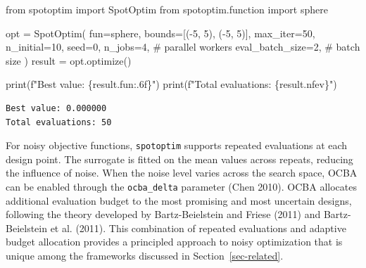 \documentclass[
  twocolumn]{article}
\newenvironment{Shaded}{\begin{snugshade}}{\end{snugshade}}
\newcommand{\BuiltInTok}[1]{\textcolor[rgb]{0.00,0.23,0.31}{#1}}
\newcommand{\CommentTok}[1]{\textcolor[rgb]{0.37,0.37,0.37}{#1}}
\newcommand{\DecValTok}[1]{\textcolor[rgb]{0.68,0.00,0.00}{#1}}
\newcommand{\ImportTok}[1]{\textcolor[rgb]{0.00,0.46,0.62}{#1}}
\newcommand{\NormalTok}[1]{\textcolor[rgb]{0.00,0.23,0.31}{#1}}
\newcommand{\OperatorTok}[1]{\textcolor[rgb]{0.37,0.37,0.37}{#1}}
\newcommand{\SpecialCharTok}[1]{\textcolor[rgb]{0.37,0.37,0.37}{#1}}
\newcommand{\SpecialStringTok}[1]{\textcolor[rgb]{0.13,0.47,0.30}{#1}}
\begin{document}
\begin{Shaded}
\begin{Highlighting}[]
\ImportTok{from}\NormalTok{ spotoptim }\ImportTok{import}\NormalTok{ SpotOptim}
\ImportTok{from}\NormalTok{ spotoptim.function }\ImportTok{import}\NormalTok{ sphere}

\NormalTok{opt }\OperatorTok{=}\NormalTok{ SpotOptim(}
\NormalTok{    fun}\OperatorTok{=}\NormalTok{sphere,}
\NormalTok{    bounds}\OperatorTok{=}\NormalTok{[(}\OperatorTok{{-}}\DecValTok{5}\NormalTok{, }\DecValTok{5}\NormalTok{), (}\OperatorTok{{-}}\DecValTok{5}\NormalTok{, }\DecValTok{5}\NormalTok{)],}
\NormalTok{    max\_iter}\OperatorTok{=}\DecValTok{50}\NormalTok{,}
\NormalTok{    n\_initial}\OperatorTok{=}\DecValTok{10}\NormalTok{,}
\NormalTok{    seed}\OperatorTok{=}\DecValTok{0}\NormalTok{,}
\NormalTok{    n\_jobs}\OperatorTok{=}\DecValTok{4}\NormalTok{,           }\CommentTok{\# parallel workers}
\NormalTok{    eval\_batch\_size}\OperatorTok{=}\DecValTok{2}\NormalTok{,  }\CommentTok{\# batch size}
\NormalTok{)}
\NormalTok{result }\OperatorTok{=}\NormalTok{ opt.optimize()}

\BuiltInTok{print}\NormalTok{(}\SpecialStringTok{f"Best value: }\SpecialCharTok{\{}\NormalTok{result}\SpecialCharTok{.}\NormalTok{fun}\SpecialCharTok{:.6f\}}\SpecialStringTok{"}\NormalTok{)}
\BuiltInTok{print}\NormalTok{(}\SpecialStringTok{f"Total evaluations: }\SpecialCharTok{\{}\NormalTok{result}\SpecialCharTok{.}\NormalTok{nfev}\SpecialCharTok{\}}\SpecialStringTok{"}\NormalTok{)}
\end{Highlighting}
\end{Shaded}

\begin{verbatim}
Best value: 0.000000
Total evaluations: 50
\end{verbatim}

For noisy objective functions, \texttt{spotoptim} supports repeated
evaluations at each design point. The surrogate is fitted on the mean
values across repeats, reducing the influence of noise. When the noise
level varies across the search space, OCBA can be enabled through the
\texttt{ocba\_delta} parameter (Chen 2010). OCBA allocates additional
evaluation budget to the most promising and most uncertain designs,
following the theory developed by Bartz-Beielstein and Friese (2011) and
Bartz-Beielstein et al. (2011). This combination of repeated evaluations
and adaptive budget allocation provides a principled approach to noisy
optimization that is unique among the frameworks discussed in
Section~\ref{sec-related}.
\end{document}
